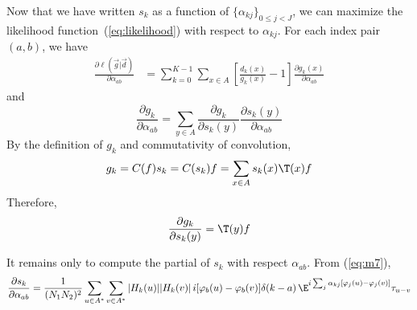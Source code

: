 Now that we have written $s_k$ as a function of $\{\alpha_{kj}\}_{0\leq j < J}$, we can
maximize the likelihood function~(\ref{eq:likelihood}) with respect to
$\alpha_{kj}$. For each index pair $(a,b)$, we have
\begin{align*}
\frac{\partial \ell\left(\vec{g} |\vec{d}\right)}{\partial \alpha_{ab}}  
&= \sum_{k=0}^{K-1} \sum_{x\in A} \left[ \frac{ d_k(x)}{g_k(x)} - 1\right] \frac{\partial g_k(x)}{\partial \alpha_{ab}} 
\end{align*}
and
\begin{equation}\label{eq:m4}
\frac{\partial g_k}{\partial \alpha_{ab}}= \sum_{y\in A} \frac{\partial g_k}{\partial s_k(y)}
\frac{\partial s_k(y)}{\partial \alpha_{ab}} 
\end{equation}
By the definition of $g_k$ and commutativity of convolution,
\[ g_k = C(f)s_k =C(s_k)f = \sum_{x\in A} s_k(x)\T(x)f \]
Therefore,
\begin{equation}\label{eq:m5}
\frac{\partial g_k}{\partial s_k(y)} = \T(y)f
\end{equation}

It remains only to compute the partial of $s_k$ with respect
$\alpha_{ab}$. From (\ref{eq:m7}),
\[
\frac{\partial s_k}{\partial \alpha_{ab}}  = 
\frac{1}{(N_1N_2)^2}\sum_{u\in A^*} \sum_{v\in A^*}  |H_k(u)||H_k(v)|\,i[\varphi_b(u)-\varphi_b(v)]\delta(k-a)
\,\E^{ i\sum_j \alpha_{kj}[\varphi_j(u)-\varphi_j(v)]} \tau_{u-v}
\]

